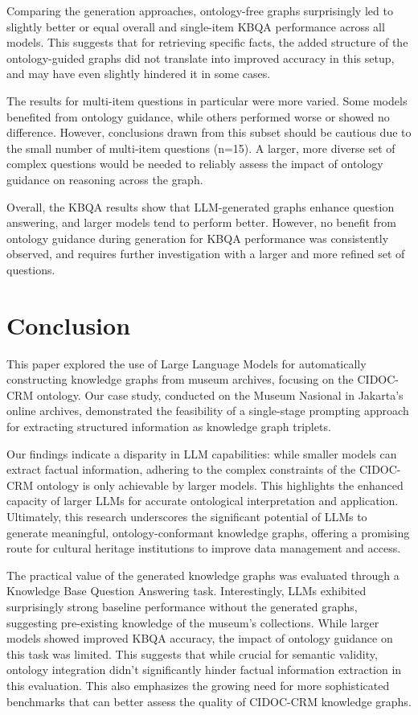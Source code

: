 \documentclass[a4, conference]{IEEEtran}
\begin{document}
Comparing the generation approaches, ontology-free graphs surprisingly led to slightly better or equal overall and single-item KBQA performance across all models. This suggests that for retrieving specific facts, the added structure of the ontology-guided graphs did not translate into improved accuracy in this setup, and may have even slightly hindered it in some cases.

The results for multi-item questions in particular were more varied. Some models benefited from ontology guidance, while others performed worse or showed no difference. However, conclusions drawn from this subset should be cautious due to the small number of multi-item questions (n=15). A larger, more diverse set of complex questions would be needed to reliably assess the impact of ontology guidance on reasoning across the graph.

Overall, the KBQA results show that LLM-generated graphs enhance question answering, and larger models tend to perform better. However, no benefit from ontology guidance during generation for KBQA performance was consistently observed, and requires further investigation with a larger and more refined set of questions.

\section{Conclusion}

This paper explored the use of Large Language Models for automatically constructing knowledge graphs from museum archives, focusing on the CIDOC-CRM ontology. Our case study, conducted on the Museum Nasional in Jakarta's online archives, demonstrated the feasibility of a single-stage prompting approach for extracting structured information as knowledge graph triplets.

Our findings indicate a disparity in LLM capabilities: while smaller models can extract factual information, adhering to the complex constraints of the CIDOC-CRM ontology is only achievable by larger models. This highlights the enhanced capacity of larger LLMs for accurate ontological interpretation and application. Ultimately, this research underscores the significant potential of LLMs to generate meaningful, ontology-conformant knowledge graphs, offering a promising route for cultural heritage institutions to improve data management and access.

The practical value of the generated knowledge graphs was evaluated through a Knowledge Base Question Answering task. Interestingly, LLMs exhibited surprisingly strong baseline performance without the generated graphs, suggesting pre-existing knowledge of the museum's collections. While larger models showed improved KBQA accuracy, the impact of ontology guidance on this task was limited. This suggests that while crucial for semantic validity, ontology integration didn't significantly hinder factual information extraction in this evaluation. This also emphasizes the growing need for more sophisticated benchmarks that can better assess the quality of CIDOC-CRM knowledge graphs.
\end{document}
